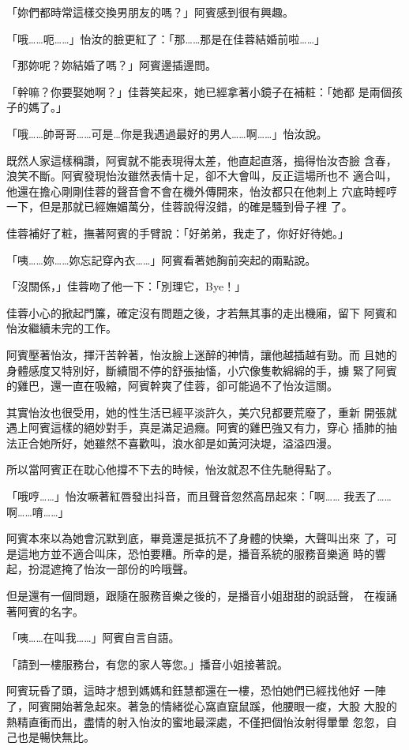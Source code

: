 「妳們都時常這樣交換男朋友的嗎？」阿賓感到很有興趣。

「哦……呃……」怡汝的臉更紅了：「那……那是在佳蓉結婚前啦……」

「那妳呢？妳結婚了嗎？」阿賓邊插邊問。

「幹嘛？你要娶她啊？」佳蓉笑起來，她已經拿著小鏡子在補粧：「她都
是兩個孩子的媽了。」

「哦……帥哥哥……可是…你是我遇過最好的男人……啊……」怡汝說。

既然人家這樣稱讚，阿賓就不能表現得太差，他直起直落，搗得怡汝杏臉
含春，浪笑不斷。阿賓發現怡汝雖然表情十足，卻不大會叫，反正這場所也不
適合叫，他還在擔心剛剛佳蓉的聲音會不會在機外傳開來，怡汝都只在他刺上
穴底時輕哼一下，但是那就已經嫵媚萬分，佳蓉說得沒錯，的確是騷到骨子裡
了。

佳蓉補好了粧，撫著阿賓的手臂說：「好弟弟，我走了，你好好待她。」

「咦……妳……妳忘記穿內衣……」阿賓看著她胸前突起的兩點說。

「沒關係，」佳蓉吻了他一下：「別理它，Bye！」

佳蓉小心的掀起門簾，確定沒有問題之後，才若無其事的走出機廂，留下
阿賓和怡汝繼續未完的工作。

阿賓壓著怡汝，揮汗苦幹著，怡汝臉上迷醉的神情，讓他越插越有勁。而
且她的身體感度又特別好，斷續間不停的舒張抽慉，小穴像隻軟綿綿的手，擄
緊了阿賓的雞巴，還一直在吸縮，阿賓幹爽了佳蓉，卻可能過不了怡汝這關。

其實怡汝也很受用，她的性生活已經平淡許久，美穴兒都要荒廢了，重新
開張就遇上阿賓這樣的絕妙對手，真是滿足過癮。阿賓的雞巴強又有力，穿心
插肺的抽法正合她所好，她雖然不喜歡叫，浪水卻是如黃河決堤，溢溢四漫。

所以當阿賓正在耽心他撐不下去的時候，怡汝就忍不住先馳得點了。

「哦哼……」怡汝噘著紅唇發出抖音，而且聲音忽然高昂起來：「啊……
我丟了……啊……唷……」

阿賓本來以為她會沉默到底，畢竟還是抵抗不了身體的快樂，大聲叫出來
了，可是這地方並不適合叫床，恐怕要糟。所幸的是，播音系統的服務音樂適
時的響起，扮混遮掩了怡汝一部份的吟哦聲。

但是還有一個問題，跟隨在服務音樂之後的，是播音小姐甜甜的說話聲，
在複誦著阿賓的名字。

「咦……在叫我……」阿賓自言自語。

「請到一樓服務台，有您的家人等您。」播音小姐接著說。

阿賓玩昏了頭，這時才想到媽媽和鈺慧都還在一樓，恐怕她們已經找他好
一陣了，阿賓開始著急起來。著急的情緒從心窩直竄鼠蹊，他腰眼一痠，大股
大股的熱精直衝而出，盡情的射入怡汝的蜜地最深處，不僅把個怡汝射得暈暈
忽忽，自己也是暢快無比。


